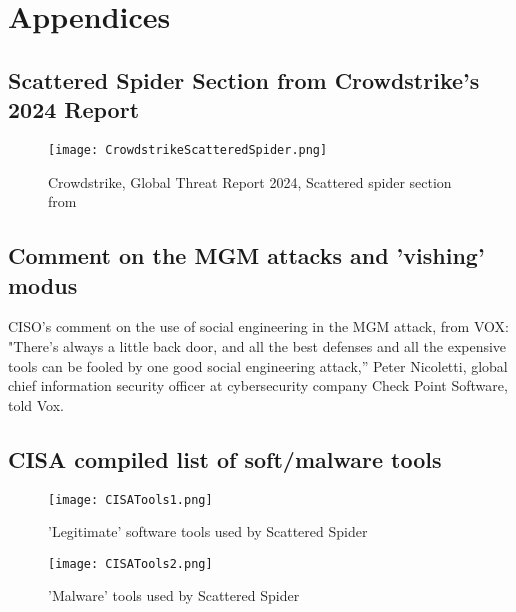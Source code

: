 \documentclass[
	letterpaper, %
	10pt, %
	unnumberedsections, %
	twoside, %
]{APAAssignment}
\begin{document}
\chapter{Appendices}
\begin{appendices}
	\section{Scattered Spider Section from Crowdstrike's 2024 Report}\label{app:CrowdStrikeScatteredSpider}

	\begin{figure}[!htp] %
		\centering
		\texttt{[image: CrowdstrikeScatteredSpider.png]}
		\caption{Crowdstrike, Global Threat Report 2024, Scattered spider section from \cite{CrowdStrikeGTR2024}}
		\label{fig:CrowdStrikeScatteredSpider}
	\end{figure}

	\section{Comment on the MGM attacks and 'vishing' modus}\label{app:voxSocialEngQuote}
	CISO's comment on the use of social engineering in the MGM attack, from VOX\cite{VOXonMGM-Hack}: \\
	"There’s always a little back door, and all the best defenses and all the expensive tools can be fooled by one good social engineering attack,” Peter Nicoletti, global chief information security officer at cybersecurity company Check Point Software, told Vox.

	\section{CISA compiled list of soft/malware tools}\label{app:SoftwareTools}

	\begin{figure}[!htp] %
		\centering
		\texttt{[image: CISATools1.png]}
		\caption{'Legitimate' software tools used by Scattered Spider\cite{CISA_ScattetedSpider}}
		\label{fig:CISATools1}
	\end{figure}

	\begin{figure}[!htp] %
		\centering
		\texttt{[image: CISATools2.png]}
		\caption{'Malware' tools used by Scattered Spider\cite{CISA_ScattetedSpider}}
		\label{fig:CISATools2}
	\end{figure}





\end{appendices}
\end{document}
